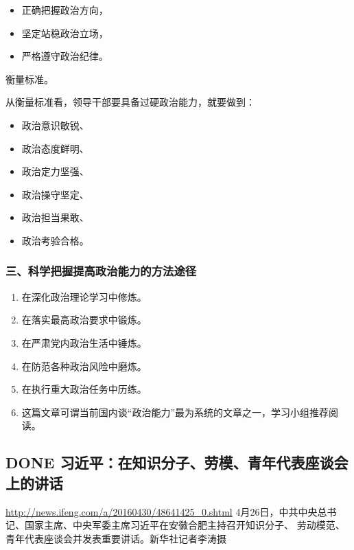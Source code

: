 \documentclass[11pt]{ctexart}
\begin{document}
{{{{\begin{itemize}
\item 正确把握政治方向，

\item 坚定站稳政治立场，

\item 严格遵守政治纪律。
\end{itemize}

衡量标准。

从衡量标准看，领导干部要具备过硬政治能力，就要做到：

\begin{itemize}
\item 政治意识敏锐、

\item 政治态度鲜明、

\item 政治定力坚强、

\item 政治操守坚定、

\item 政治担当果敢、

\item 政治考验合格。
\end{itemize}

\subsubsection{三、科学把握提高政治能力的方法途径}
\label{sec:org3529ced}

\begin{enumerate}
\item 在深化政治理论学习中修炼。

\item 在落实最高政治要求中锻炼。

\item 在严肃党内政治生活中锤炼。

\item 在防范各种政治风险中磨炼。

\item 在执行重大政治任务中历练。

\item 这篇文章可谓当前国内谈“政治能力”最为系统的文章之一，学习小组推荐阅读。
\end{enumerate}
\subsection{{\bfseries\sffamily DONE} 习近平：在知识分子、劳模、青年代表座谈会上的讲话}
\label{sec:orgafe54af}
\url{http://news.ifeng.com/a/20160430/48641425\_0.shtml}
4月26日，中共中央总书记、国家主席、中央军委主席习近平在安徽合肥主持召开知识分子、
劳动模范、青年代表座谈会并发表重要讲话。新华社记者李涛摄


}}}}
\end{document}
